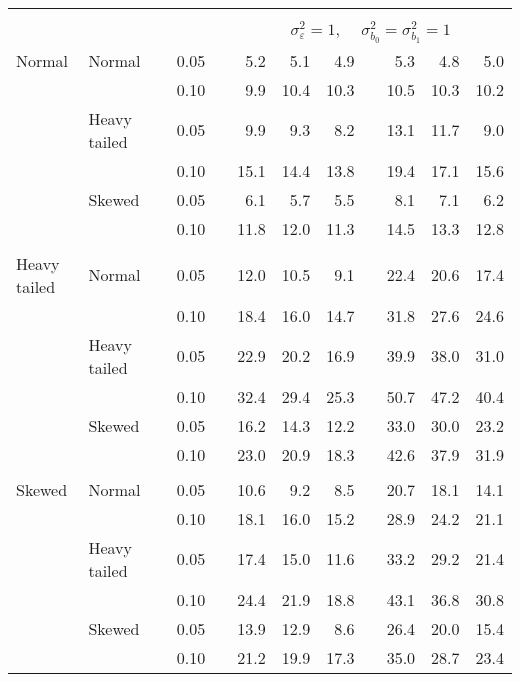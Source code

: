 \begin{table}[ht]
\begin{scriptsize}
\begin{tabular}{ll p{.1cm} c p{.1cm} rrr p{.1cm} rrr}
&&&&&&&&&&&\\
& && && \multicolumn{7}{c}{$\sigma_{\varepsilon}^2 = 1$, \ \ $\sigma_{b_0}^2 = \sigma_{b_1}^2 = 1$} \\ \cline{6-12}
\rowcolor{gray!20} Normal & Normal &  & 0.05 &  & 5.2 & 5.1 & 4.9 &  & 5.3 & 4.8 & 5.0 \\ 
\rowcolor{gray!20}    &  &  & 0.10 &  & 9.9 & 10.4 & 10.3 &  & 10.5 & 10.3 & 10.2 \\ 
\rowcolor{gray!20}    & Heavy tailed &  & 0.05 &  & 9.9 & 9.3 & 8.2 &  & 13.1 & 11.7 & 9.0 \\ 
\rowcolor{gray!20}    &  &  & 0.10 &  & 15.1 & 14.4 & 13.8 &  & 19.4 & 17.1 & 15.6 \\ 
\rowcolor{gray!20}    & Skewed &  & 0.05 &  & 6.1 & 5.7 & 5.5 &  & 8.1 & 7.1 & 6.2 \\ 
\rowcolor{gray!20}    &  &  & 0.10 &  & 11.8 & 12.0 & 11.3 &  & 14.5 & 13.3 & 12.8 \\ 
&&&&&&&&&&&\\
  Heavy tailed & Normal &  & 0.05 &  & 12.0 & 10.5 & 9.1 &  & 22.4 & 20.6 & 17.4 \\ 
   &  &  & 0.10 &  & 18.4 & 16.0 & 14.7 &  & 31.8 & 27.6 & 24.6 \\ 
   & Heavy tailed &  & 0.05 &  & 22.9 & 20.2 & 16.9 &  & 39.9 & 38.0 & 31.0 \\ 
   &  &  & 0.10 &  & 32.4 & 29.4 & 25.3 &  & 50.7 & 47.2 & 40.4 \\ 
   & Skewed &  & 0.05 &  & 16.2 & 14.3 & 12.2 &  & 33.0 & 30.0 & 23.2 \\ 
   &  &  & 0.10 &  & 23.0 & 20.9 & 18.3 &  & 42.6 & 37.9 & 31.9 \\ 
&&&&&&&&&&&\\
  Skewed & Normal &  & 0.05 &  & 10.6 & 9.2 & 8.5 &  & 20.7 & 18.1 & 14.1 \\ 
   &  &  & 0.10 &  & 18.1 & 16.0 & 15.2 &  & 28.9 & 24.2 & 21.1 \\ 
   & Heavy tailed &  & 0.05 &  & 17.4 & 15.0 & 11.6 &  & 33.2 & 29.2 & 21.4 \\ 
   & &  & 0.10 &  & 24.4 & 21.9 & 18.8 &  & 43.1 & 36.8 & 30.8 \\ 
   & Skewed &  & 0.05 &  & 13.9 & 12.9 & 8.6 &  & 26.4 & 20.0 & 15.4 \\ 
   &  &  & 0.10 &  & 21.2 & 19.9 & 17.3 &  & 35.0 & 28.7 & 23.4 \\ 


\end{tabular}
\end{scriptsize}
\end{table}
